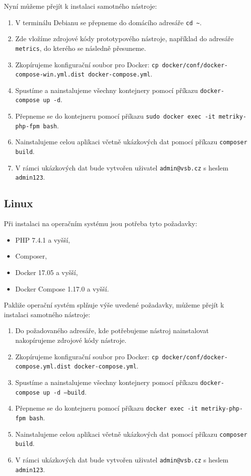 \documentclass[czech,master]{diploma}
\begin{document}
Nyní můžeme přejít k instalaci samotného nástroje:
\begin{enumerate}
\item V terminálu Debianu se přepneme do domácího adresáře \texttt{cd \textasciitilde}.
\item Zde vložíme zdrojové kódy prototypového nástroje, například do adresáře \texttt{metrics}, do kterého se následně přesuneme.
\item Zkopírujeme konfigurační soubor pro Docker: \texttt{cp docker/conf/docker-compose-win.yml.dist docker-compose.yml}.
\item Spustíme a nainstalujeme všechny kontejnery pomocí příkazu \texttt{docker-compose up -d}.
\item Přepneme se do kontejneru pomocí příkazu \texttt{sudo docker exec -it metriky-php-fpm bash}.
\item Nainstalujeme celou aplikaci včetně ukázkových dat pomocí příkazu \texttt{composer build}.
\item V rámci ukázkových dat bude vytvořen uživatel \texttt{admin@vsb.cz} s heslem \texttt{admin123}.
\end{enumerate}

\subsection{Linux}
Při instalaci na operačním systému jsou potřeba tyto požadavky:
\begin{itemize}
\item PHP 7.4.1 a vyšší,
\item Composer,
\item Docker 17.05 a vyšší,
\item Docker Compose 1.17.0 a vyšší.
\end{itemize}
 
 Pakliže operační systém splňuje výše uvedené požadavky, můžeme přejít k instalaci samotného nástroje:
\begin{enumerate}
\item Do požadovaného adresáře, kde potřebujeme nástroj nainstalovat nakopírujeme zdrojové kódy nástroje.
\item Zkopírujeme konfigurační soubor pro Docker: \texttt{cp docker/conf/docker-compose.yml.dist docker-compose.yml}.
\item Spustíme a nainstalujeme všechny kontejnery pomocí příkazu \texttt{docker-compose up -d --build}.
\item Přepneme se do kontejneru pomocí příkazu \texttt{docker exec -it metriky-php-fpm bash}.
\item Nainstalujeme celou aplikaci včetně ukázkových dat pomocí příkazu \texttt{composer build}.
\item V rámci ukázkových dat bude vytvořen uživatel \texttt{admin@vsb.cz} s heslem \texttt{admin123}.
\end{enumerate}
\end{document}
